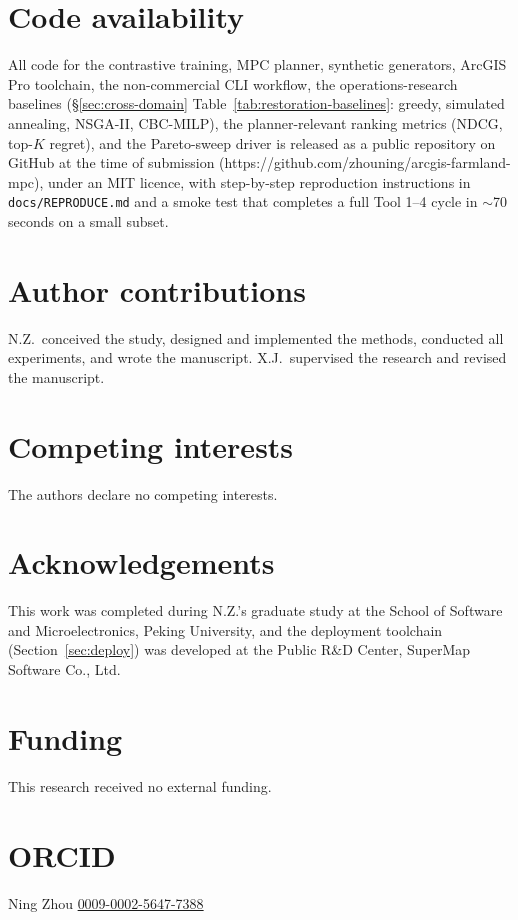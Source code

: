 \documentclass[11pt]{article}
\begin{document}
\section*{Code availability}
All code for the contrastive training, MPC planner, synthetic generators, ArcGIS Pro toolchain, the non-commercial CLI workflow, the operations-research baselines (\S\ref{sec:cross-domain} Table~\ref{tab:restoration-baselines}: greedy, simulated annealing, NSGA-II, CBC-MILP), the planner-relevant ranking metrics (NDCG, top-$K$ regret), and the Pareto-sweep driver is released as a public repository on GitHub at the time of submission (https://github.com/zhouning/arcgis-farmland-mpc), under an MIT licence, with step-by-step reproduction instructions in \texttt{docs/REPRODUCE.md} and a smoke test that completes a full Tool 1--4 cycle in $\sim$70 seconds on a small subset.

\section*{Author contributions}
N.Z.\ conceived the study, designed and implemented the methods, conducted all experiments, and wrote the manuscript. X.J.\ supervised the research and revised the manuscript.

\section*{Competing interests}
The authors declare no competing interests.

\section*{Acknowledgements}
This work was completed during N.Z.'s graduate study at the School of Software and Microelectronics, Peking University, and the deployment toolchain (Section~\ref{sec:deploy}) was developed at the Public R\&D Center, SuperMap Software Co., Ltd.

\section*{Funding}
This research received no external funding.

\section*{ORCID}
Ning Zhou \href{https://orcid.org/0009-0002-5647-7388}{0009-0002-5647-7388}


\end{document}

